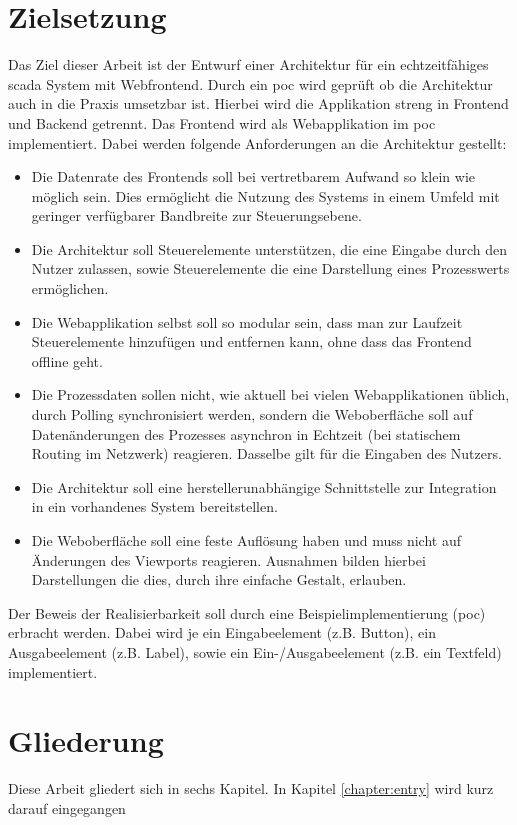 \section{Zielsetzung}
Das Ziel dieser Arbeit ist der Entwurf einer Architektur für ein
echtzeitfähiges \ac{scada} System mit Webfrontend.
Durch ein \ac{poc} wird geprüft ob die Architektur auch in die Praxis umsetzbar ist.
Hierbei wird die Applikation streng in Frontend und Backend getrennt. Das Frontend wird als Webapplikation im \ac{poc} implementiert.
Dabei werden folgende Anforderungen an die Architektur gestellt:
\begin{itemize}
    \item   Die Datenrate des Frontends soll bei vertretbarem Aufwand so klein wie möglich sein.
            Dies ermöglicht die Nutzung des Systems in einem Umfeld mit geringer verfügbarer Bandbreite zur Steuerungsebene.
    \item   Die Architektur soll Steuerelemente unterstützen, die eine Eingabe durch den Nutzer zulassen, sowie Steuerelemente die eine Darstellung eines Prozesswerts ermöglichen.
    \item   Die Webapplikation selbst soll so modular sein, dass man zur Laufzeit Steuerelemente hinzufügen und entfernen kann, ohne dass das Frontend offline geht.
    \item   Die Prozessdaten sollen nicht, wie aktuell bei vielen Webapplikationen üblich, durch Polling synchronisiert werden, sondern die Weboberfläche soll auf Datenänderungen des Prozesses asynchron in Echtzeit (bei statischem Routing im Netzwerk) reagieren. Dasselbe gilt für die Eingaben des Nutzers.
    \item   Die Architektur soll eine herstellerunabhängige Schnittstelle zur Integration in ein vorhandenes System bereitstellen.
    \item   Die Weboberfläche soll eine feste Auflösung haben und muss nicht auf Änderungen des Viewports reagieren.
            Ausnahmen bilden hierbei Darstellungen die dies, durch ihre einfache Gestalt, erlauben.
\end{itemize}
Der Beweis der Realisierbarkeit soll durch eine Beispielimplementierung (\ac{poc}) erbracht werden.
Dabei wird je ein Eingabeelement (z.B. Button), ein Ausgabeelement (z.B. Label), sowie ein Ein-/Ausgabeelement (z.B. ein Textfeld) implementiert.

\section{Gliederung}
Diese Arbeit gliedert sich in sechs Kapitel. In Kapitel \ref{chapter:entry} wird kurz darauf eingegangen 